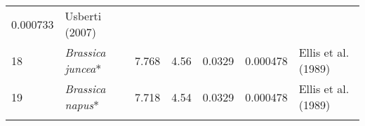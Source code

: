 \documentclass[]{article}
\begin{document}
\begin{longtable}[]{@{}lllllll@{}}
\begin{minipage}[t]{0.08\columnwidth}
0.000733\strut
\end{minipage} & \begin{minipage}[t]{0.23\columnwidth}\raggedright
Usberti (2007)\strut
\end{minipage}\tabularnewline
\begin{minipage}[t]{0.05\columnwidth}\raggedright
18\strut
\end{minipage} & \begin{minipage}[t]{0.23\columnwidth}\raggedright
\emph{Brassica juncea}*\strut
\end{minipage} & \begin{minipage}[t]{0.05\columnwidth}\raggedright
7.768\strut
\end{minipage} & \begin{minipage}[t]{0.08\columnwidth}\raggedright
4.56\strut
\end{minipage} & \begin{minipage}[t]{0.08\columnwidth}\raggedright
0.0329\strut
\end{minipage} & \begin{minipage}[t]{0.08\columnwidth}\raggedright
0.000478\strut
\end{minipage} & \begin{minipage}[t]{0.23\columnwidth}\raggedright
Ellis et al. (1989)\strut
\end{minipage}\tabularnewline
\begin{minipage}[t]{0.05\columnwidth}\raggedright
19\strut
\end{minipage} & \begin{minipage}[t]{0.23\columnwidth}\raggedright
\emph{Brassica napus}*\strut
\end{minipage} & \begin{minipage}[t]{0.05\columnwidth}\raggedright
7.718\strut
\end{minipage} & \begin{minipage}[t]{0.08\columnwidth}\raggedright
4.54\strut
\end{minipage} & \begin{minipage}[t]{0.08\columnwidth}\raggedright
0.0329\strut
\end{minipage} & \begin{minipage}[t]{0.08\columnwidth}\raggedright
0.000478\strut
\end{minipage} & \begin{minipage}[t]{0.23\columnwidth}\raggedright
Ellis et al. (1989)\strut
\end{minipage}\tabularnewline
\begin{minipage}[t]{0.05\columnwidth}\raggedright

\end{minipage}
\end{longtable}
\end{document}

